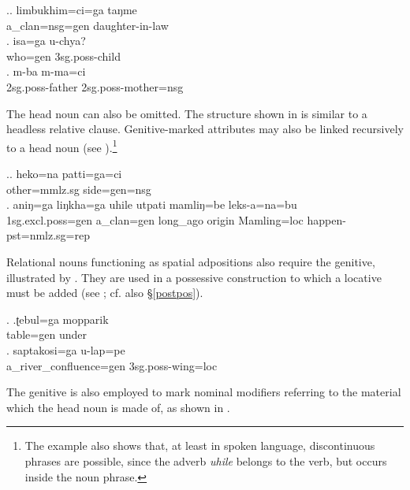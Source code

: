 		\ex.\ag. limbukhim=ci=ga       taŋme\\
		a\_clan{\sc =nsg=gen} daughter-in-law\\
 
	\bg. isa=ga u-chya?\\
	who{\sc =gen} {\sc 3sg.poss-}child\\
		\bg. m-ba m-ma=ci\\
		{\sc 2sg.poss-}father {\sc 2sg.poss-}mother{\sc =nsg}	\\
	
The head noun can also be omitted. The  structure shown in \Next[a] is similar to a headless relative clause. Genitive-marked attributes may also  be linked recursively to a head noun (see \Next[b]).\footnote{The example also shows that, at least in spoken language, discontinuous phrases are possible, since the adverb \emph{uhile} belongs to the verb, but occurs inside the noun phrase.}



\ex.\ag. heko=na    patti=ga=ci\\
		other{\sc =mmlz.sg} side{\sc =gen=nsg}	\\
	 
	\bg. aniŋ=ga liŋkha=ga uhile utpati mamliŋ=be      leks-a=na=bu\\
		{\sc 1sg.excl.poss=gen} a\_clan{\sc =gen} long\_ago origin Mamling{\sc =loc} happen{\sc [3sg]-pst=nmlz.sg=rep}\\
		  

Relational nouns functioning as spatial adpositions also require the genitive, illustrated by \Next . They are used in a possessive construction to which a locative must be added (see \Next[b]; cf. also §\ref{postpos}). 
	
\ex. \ag.ʈebul=ga mopparik\\
			table{\sc =gen} under\\
	\bg. saptakosi=ga u-lap=pe\\
		a\_river\_confluence{\sc =gen} {\sc 3sg.poss-}wing{\sc =loc}\\
	   

The genitive is also employed to mark nominal modifiers referring to the material which the head noun is made of, as shown in \Next.

